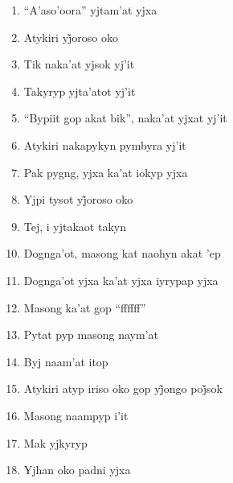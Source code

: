 \begin{enumerate}
 \item ``A'aso'oora'' yjtam'at yjxa

 \item Atykiri yj̃oroso oko

 \begin{center}\end{center}

 \item Tik naka'at yjsok yj'it

 \item Takyryp yjta'atot yj'it

 \item ``Bypiit gop akat bik'', naka'at yjxat yj'it

 \item Atykiri nakapykyn pymbyra yj'it

 \begin{center}\end{center}

 \item Pak pygng, yjxa ka'at iokyp yjxa

 \item Yjpi tysot yj̃oroso oko

 \item Tej, i yjtakaot takyn

 \item Dognga'ot, masong kat naohyn akat 'ep

 \item Dognga'ot yjxa ka'at yjxa iyrypap yjxa

 \begin{center}\end{center}

 \item Masong ka'at gop ``ffffff''

 \item Pytat pyp masong naym'at

 \item Byj naam'at itop

 \item Atykiri atyp iriso oko gop yj̃ongo poj̃sok

 \item Masong naampyp i'it

 \item Mak yjkyryp

 \item Yjhan oko padni yjxa

 \begin{center}\end{center}


\end{enumerate}
